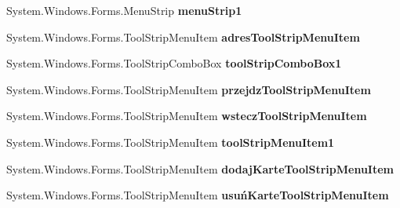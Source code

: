 \begin{DoxyCompactItemize}
\mbox{\label{class_windows_forms_app2_1_1_przegladarka_a2a73e12868cd6458c615db8cdf4bb065}} 
System.\+Windows.\+Forms.\+Menu\+Strip {\bfseries menu\+Strip1}
\item 
\mbox{\label{class_windows_forms_app2_1_1_przegladarka_adeee418fd4c8b86a5fc5139164bf98ba}} 
System.\+Windows.\+Forms.\+Tool\+Strip\+Menu\+Item {\bfseries adres\+Tool\+Strip\+Menu\+Item}
\item 
\mbox{\label{class_windows_forms_app2_1_1_przegladarka_af586dc21d800941eb565080947eafd55}} 
System.\+Windows.\+Forms.\+Tool\+Strip\+Combo\+Box {\bfseries tool\+Strip\+Combo\+Box1}
\item 
\mbox{\label{class_windows_forms_app2_1_1_przegladarka_afeb83789a4b241702af05d7fae1f6f99}} 
System.\+Windows.\+Forms.\+Tool\+Strip\+Menu\+Item {\bfseries przejdz\+Tool\+Strip\+Menu\+Item}
\item 
\mbox{\label{class_windows_forms_app2_1_1_przegladarka_a559c195b9b163e11b978d6dc9140118e}} 
System.\+Windows.\+Forms.\+Tool\+Strip\+Menu\+Item {\bfseries wstecz\+Tool\+Strip\+Menu\+Item}
\item 
\mbox{\label{class_windows_forms_app2_1_1_przegladarka_a06bd930ae9502e3130812c6e949d034e}} 
System.\+Windows.\+Forms.\+Tool\+Strip\+Menu\+Item {\bfseries tool\+Strip\+Menu\+Item1}
\item 
\mbox{\label{class_windows_forms_app2_1_1_przegladarka_aa847ef973d76583fad06069687cbde08}} 
System.\+Windows.\+Forms.\+Tool\+Strip\+Menu\+Item {\bfseries dodaj\+Karte\+Tool\+Strip\+Menu\+Item}
\item 
\mbox{\label{class_windows_forms_app2_1_1_przegladarka_a57bf4cc0dbb4b2cb91cd72013b7e69ca}} 
System.\+Windows.\+Forms.\+Tool\+Strip\+Menu\+Item {\bfseries usuń\+Karte\+Tool\+Strip\+Menu\+Item}
\item 
\mbox{\label{class_windows_forms_app2_1_1_przegladarka_ad7aa576ee790c104bf466d5609e5b4be}} 

\end{DoxyCompactItemize}
